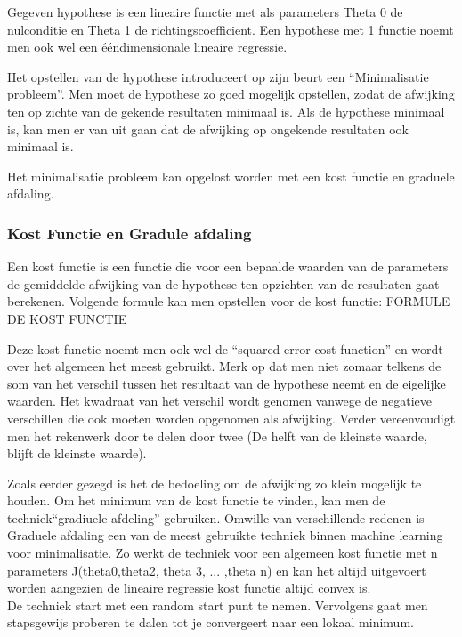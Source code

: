 Gegeven hypothese is een lineaire functie met als parameters Theta 0 de nulconditie en Theta 1 de richtingscoefficient. Een hypothese met 1 functie noemt men ook wel een ééndimensionale lineaire regressie.

\newline

Het opstellen van de hypothese introduceert op zijn beurt een ``Minimalisatie probleem''. Men moet de hypothese zo goed mogelijk opstellen, zodat de afwijking ten op zichte van de gekende resultaten minimaal is. Als de hypothese minimaal is, kan men er van uit gaan dat de afwijking op ongekende resultaten ook minimaal is.

Het minimalisatie probleem kan opgelost worden met een kost functie en graduele afdaling.

\subsubsection{Kost Functie en Gradule afdaling}\label{Kost Functie en Gradule afdaling}

Een kost functie is een functie die voor een bepaalde waarden van de parameters de gemiddelde afwijking van de hypothese ten opzichten van de resultaten gaat berekenen. Volgende formule kan men opstellen voor de kost functie:
\newline
\newline
FORMULE DE KOST FUNCTIE
\newline

Deze kost functie noemt men ook wel de ``squared error cost function'' en wordt over het algemeen het meest gebruikt. 
Merk op dat men niet zomaar telkens de som van het verschil tussen het resultaat van de hypothese neemt en de eigelijke waarden. Het kwadraat van het verschil wordt genomen vanwege de negatieve verschillen die ook moeten worden opgenomen als afwijking. Verder vereenvoudigt men het rekenwerk door te delen door twee (De helft van de kleinste waarde, blijft de kleinste waarde). 

Zoals eerder gezegd is het de bedoeling om de afwijking zo klein mogelijk te houden. Om het minimum van de kost functie te vinden, kan men de techniek``gradiuele afdeling'' gebruiken. Omwille van verschillende redenen is Graduele afdaling een van de meest gebruikte techniek binnen machine learning voor minimalisatie. Zo werkt de techniek voor een algemeen kost functie met n parameters J(theta0,theta2, theta 3, ... ,theta n) en kan het altijd uitgevoert worden aangezien de lineaire regressie kost functie altijd convex is.
\\
De techniek start met een random start punt te nemen. Vervolgens gaat men stapsgewijs proberen te dalen tot je convergeert naar een lokaal minimum.


